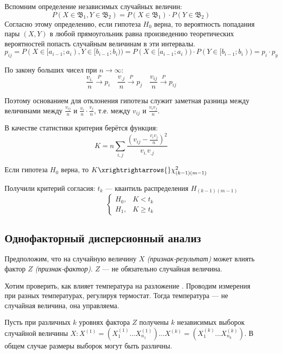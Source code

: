 Вспомним определение независимых случайных величин:
\[P(X \in \mathfrak{B}_1, Y \in \mathfrak{B}_2) = P(X \in \mathfrak{B}_1) \cdot P(Y \in \mathfrak{B}_2)\]
Согласно этому определению, если гипотеза \(H_0\) верна, то вероятность попадания пары \((X, Y)\) в любой прямоугольник равна произведению теоретических вероятностей попасть случайным величинам в эти интервалы.
\[p_{ij} = P (X \in [a_{i-1}; a_i), Y \in [b_{i-1}; b_i)) = P(X \in [a_{i-1}; a_i)) \cdot P(Y \in [b_{i-1}; b_i)) = p_i \cdot p_y\]

По закону больших чисел при \(n \to \infty\):
\[\frac{v_{i.}}{n} \xrightarrow{P} p_i \quad \frac{v_{.j}}{n} \xrightarrow{P} p_j \quad \frac{v_{ij}}{n} \xrightarrow{P} p_{ij}\]

Поэтому основанием для отклонения гипотезы служит заметная разница между величинами между \(\frac{v_{ij}}{n}\) и \(\frac{v_i}{n} \cdot \frac{v_j}{n}\), т.е. между \(v_{ij}\) и \(\frac{v_iv_j}{n}\).

В качестве статистики критерия берётся функция:
\[K = n \sum_{i, j} \frac{\left(v_{ij} - \frac{v_iv_j}{n}\right)^2}{v_{i.}v_{.j}}\]

\begin{theorem}
    Если гипотеза \(H_0\) верна, то \(K \xrightrightarrows{} \chi^2_{(k - 1)(m - 1)}\)
\end{theorem}

Получили критерий согласия: \(t_k\) --- квантиль распределения \(H_{(k - 1)(m - 1)}\)
\[\begin{cases}
        H_0, & K < t_k    \\
        H_1, & K \geq t_k
    \end{cases}\]

\subsection{Однофакторный дисперсионный анализ}

Предположим, что на случайную величину \(X\) \textit{(признак-результат)} может влиять фактор \(Z\) \textit{(признак-фактор)}. \(Z\) --- не обязательно случайная величина.

\begin{example}
    Хотим проверить, как влияет температура на разложение \?. Проводим измерения при разных температурах, регулируя термостат. Тогда температура --- не случайная величина, она управляема.
\end{example}

Пусть при различных \(k\) уровнях фактора \(Z\) получены \(k\) независимых выборок случайной величины \(X : X^{(1)} = (X^{(1)}_1 \dots X^{(1)}_{n_1}) \dots X^{(k)} = (X^{(k)}_1 \dots X^{(k)}_{n_k})\). В общем случае размеры выборок могут быть различны.

